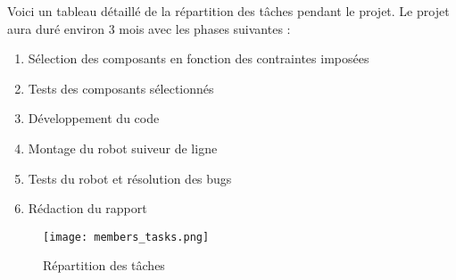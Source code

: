 Voici un tableau détaillé de la répartition des tâches pendant le projet.
Le projet aura duré environ 3 mois avec les phases suivantes :
\begin{enumerate}
    \item Sélection des composants en fonction des contraintes imposées
    \item Tests des composants sélectionnés
    \item Développement du code
    \item Montage du robot suiveur de ligne
    \item Tests du robot et résolution des bugs
    \item Rédaction du rapport
\end{enumerate}

\begin{figure}[h]
    \centering
    \texttt{[image: members\_tasks.png]}
    \caption{Répartition des tâches}
    \label{fig:Répartition des tâches}
\end{figure}

\newpage
